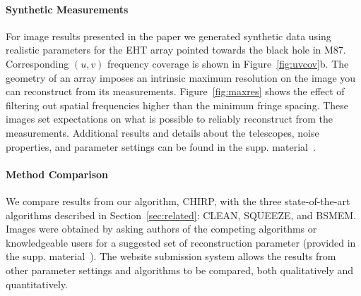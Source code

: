 \vspace{-.15in}
\paragraph{Synthetic Measurements}
For image results presented in the paper we generated synthetic data using realistic parameters for the EHT array pointed towards the black hole in M87.
Corresponding $(u,v)$ frequency coverage is shown in Figure~\ref{fig:uvcov}b.
The geometry of an array imposes an intrinsic maximum resolution on the image you can reconstruct from its measurements. Figure~\ref{fig:maxres} shows the effect of filtering out spatial frequencies higher than the minimum fringe spacing.
These images set expectations on what is possible to reliably reconstruct from the measurements.
Additional results and details about the telescopes, noise properties, and parameter settings can be found in the supp. material~\cite{suppmaterial}. 

\vspace{-.15in}
\paragraph{Method Comparison} We compare results from our algorithm, CHIRP, with the three state-of-the-art algorithms described in Section~\ref{sec:related}: CLEAN, SQUEEZE, and BSMEM. 
Images were obtained by asking authors of the competing algorithms or knowledgeable users for a suggested set of reconstruction parameter (provided in the supp. material~\cite{suppmaterial}). 
The website submission system allows the results from other parameter settings and
algorithms to be compared, both qualitatively and quantitatively.


